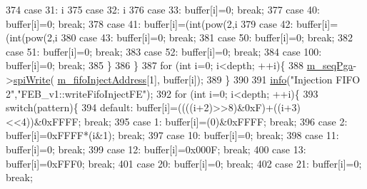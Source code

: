 \begin{DoxyCode}
374     \textcolor{keywordflow}{case} 31:  i%
375     \textcolor{keywordflow}{case} 32:  i%
376     \textcolor{keywordflow}{case} 33:  buffer[i]=0; \textcolor{keywordflow}{break};
377     \textcolor{keywordflow}{case} 40:  buffer[i]=0; \textcolor{keywordflow}{break};
378     \textcolor{keywordflow}{case} 41:  buffer[i]=(int(pow(2,i%
379     \textcolor{keywordflow}{case} 42:  buffer[i]=(int(pow(2,i%
380     \textcolor{keywordflow}{case} 43:  buffer[i]=0; \textcolor{keywordflow}{break};
381     \textcolor{keywordflow}{case} 50:  buffer[i]=0; \textcolor{keywordflow}{break};
382     \textcolor{keywordflow}{case} 51:  buffer[i]=0; \textcolor{keywordflow}{break};
383     \textcolor{keywordflow}{case} 52:  buffer[i]=0; \textcolor{keywordflow}{break};
384     \textcolor{keywordflow}{case} 100: buffer[i]=0; \textcolor{keywordflow}{break};
385    \}
386    \}
387   \textcolor{keywordflow}{for} (\textcolor{keywordtype}{int} i=0; i<depth; ++i)\{
388     \hyperlink{classFEB__v1_a6c7804ac86796f233a8393043adf2e77}{m\_seqPga}->\hyperlink{classSeqPGA_ad4421841ce4ce8b88ad13f63216f0743}{spiWrite}( \hyperlink{classFEB__v1_afd035f292061e1823ed64471bb0228ef}{m\_fifoInjectAddress}[1], buffer[i]);
389   \}
390   
391   \hyperlink{classObject_a644fd329ea4cb85f54fa6846484b84a8}{info}(\textcolor{stringliteral}{"Injection FIFO 2"},\textcolor{stringliteral}{"FEB\_v1::writeFifoInjectFE"});        
392   \textcolor{keywordflow}{for} (\textcolor{keywordtype}{int} i=0; i<depth; ++i)\{ 
393     \textcolor{keywordflow}{switch}(pattern)\{
394     \textcolor{keywordflow}{default}:  buffer[i]=((((i+2)>>8)&0xF)+((i+3)<<4))&0xFFFF; \textcolor{keywordflow}{break};
395     \textcolor{keywordflow}{case} 1:   buffer[i]=(0)&0xFFFF; \textcolor{keywordflow}{break};
396     \textcolor{keywordflow}{case} 2:   buffer[i]=0xFFFF*(i&1); \textcolor{keywordflow}{break};
397     \textcolor{keywordflow}{case} 10:  buffer[i]=0; \textcolor{keywordflow}{break};
398     \textcolor{keywordflow}{case} 11:  buffer[i]=0; \textcolor{keywordflow}{break};
399     \textcolor{keywordflow}{case} 12:  buffer[i]=0x000F; \textcolor{keywordflow}{break};
400     \textcolor{keywordflow}{case} 13:  buffer[i]=0xFFF0; \textcolor{keywordflow}{break};
401     \textcolor{keywordflow}{case} 20:  buffer[i]=0; \textcolor{keywordflow}{break};
402     \textcolor{keywordflow}{case} 21:  buffer[i]=0; \textcolor{keywordflow}{break};

\end{DoxyCode}
